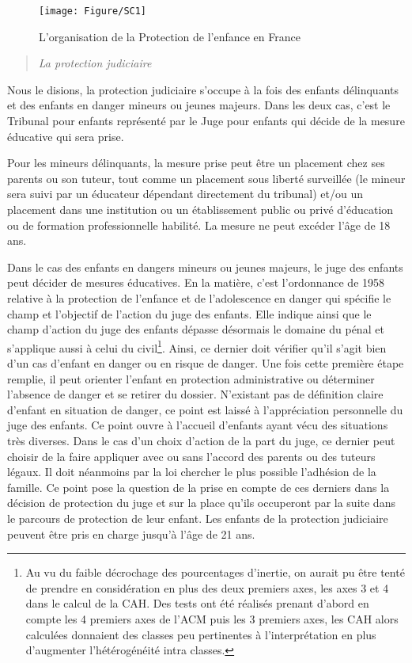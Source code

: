 \documentclass[
  12,
  a4paper,
]{report}
\begin{document}
\begin{figure}

{\centering \texttt{[image: Figure/SC1]} 

}

\caption{L'organisation de la Protection de l'enfance en France}\label{fig:unnamed-chunk-8}
\end{figure}

\begin{quote}
\emph{La protection judiciaire}
\end{quote}

Nous le disions, la protection judiciaire s'occupe à la fois des enfants
délinquants et des enfants en danger mineurs ou jeunes majeurs. Dans les
deux cas, c'est le Tribunal pour enfants représenté par le Juge pour
enfants qui décide de la mesure éducative qui sera prise.

Pour les mineurs délinquants, la mesure prise peut être un placement
chez ses parents ou son tuteur, tout comme un placement sous liberté
surveillée (le mineur sera suivi par un éducateur dépendant directement
du tribunal) et/ou un placement dans une institution ou un établissement
public ou privé d'éducation ou de formation professionnelle habilité. La
mesure ne peut excéder l'âge de 18 ans.

Dans le cas des enfants en dangers mineurs ou jeunes majeurs, le juge
des enfants peut décider de mesures éducatives. En la matière, c'est
l'ordonnance de 1958 relative à la protection de l'enfance et de
l'adolescence en danger qui spécifie le champ et l'objectif de l'action
du juge des enfants. Elle indique ainsi que le champ d'action du juge
des enfants dépasse désormais le domaine du pénal et s'applique aussi à
celui du civil\footnote{Au vu du faible décrochage des pourcentages
  d'inertie, on aurait pu être tenté de prendre en considération en plus
  des deux premiers axes, les axes 3 et 4 dans le calcul de la CAH. Des
  tests ont été réalisés prenant d'abord en compte les 4 premiers axes
  de l'ACM puis les 3 premiers axes, les CAH alors calculées donnaient
  des classes peu pertinentes à l'interprétation en plus d'augmenter
  l'hétérogénéité intra classes.}. Ainsi, ce dernier doit vérifier qu'il
s'agit bien d'un cas d'enfant en danger ou en risque de danger. Une fois
cette première étape remplie, il peut orienter l'enfant en protection
administrative ou déterminer l'absence de danger et se retirer du
dossier. N'existant pas de définition claire d'enfant en situation de
danger, ce point est laissé à l'appréciation personnelle du juge des
enfants. Ce point ouvre à l'accueil d'enfants ayant vécu des situations
très diverses. Dans le cas d'un choix d'action de la part du juge, ce
dernier peut choisir de la faire appliquer avec ou sans l'accord des
parents ou des tuteurs légaux. Il doit néanmoins par la loi chercher le
plus possible l'adhésion de la famille. Ce point pose la question de la
prise en compte de ces derniers dans la décision de protection du juge
et sur la place qu'ils occuperont par la suite dans le parcours de
protection de leur enfant. Les enfants de la protection judiciaire
peuvent être pris en charge jusqu'à l'âge de 21 ans.
\end{document}
